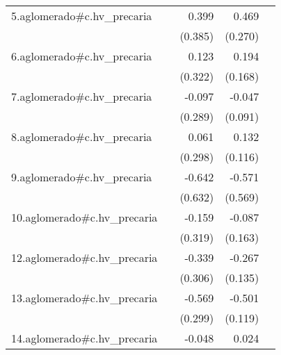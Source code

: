 {\begin{longtable}{l*{4}{D{.}{.}{-1}}}
\addlinespace
5.aglomerado#c.hv\_precaria&                     &       0.399         &       0.469         &                     \\
            &                     &     (0.385)         &     (0.270)         &                     \\
\addlinespace
6.aglomerado#c.hv\_precaria&                     &       0.123         &       0.194         &                     \\
            &                     &     (0.322)         &     (0.168)         &                     \\
\addlinespace
7.aglomerado#c.hv\_precaria&                     &      -0.097         &      -0.047         &                     \\
            &                     &     (0.289)         &     (0.091)         &                     \\
\addlinespace
8.aglomerado#c.hv\_precaria&                     &       0.061         &       0.132         &                     \\
            &                     &     (0.298)         &     (0.116)         &                     \\
\addlinespace
9.aglomerado#c.hv\_precaria&                     &      -0.642         &      -0.571         &                     \\
            &                     &     (0.632)         &     (0.569)         &                     \\
\addlinespace
10.aglomerado#c.hv\_precaria&                     &      -0.159         &      -0.087         &                     \\
            &                     &     (0.319)         &     (0.163)         &                     \\
\addlinespace
12.aglomerado#c.hv\_precaria&                     &      -0.339         &      -0.267\sym{*}  &                     \\
            &                     &     (0.306)         &     (0.135)         &                     \\
\addlinespace
13.aglomerado#c.hv\_precaria&                     &      -0.569         &      -0.501\sym{***}&                     \\
            &                     &     (0.299)         &     (0.119)         &                     \\
\addlinespace
14.aglomerado#c.hv\_precaria&                     &      -0.048         &       0.024         &                     \\

\end{longtable}}
